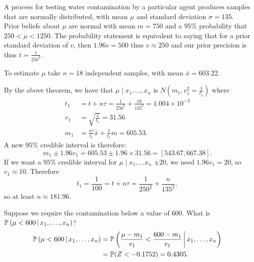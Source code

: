 \documentclass[10pt, a4paper]{article}
\begin{document}
\begin{example}
    A process for testing water contamination by a particular agent produces samples that are normally distributed,
    with mean $\mu$ and standard deviation $\sigma = 135$.
    Prior beliefs about $\mu$ are normal with mean $m = 750$ and a $95\%$ probability that $250 < \mu < 1250$.
    The probability statement is equivalent to saying that for a prior standard deviation of $v$,
    then $1.96v = 500$ thus $v \approx 250$ and our prior precision is thus $t = \frac{1}{250 ^ 2}$.

    To estimate $\mu$ take $n = 18$ independent samples,
    with mean $\bar{x} = 603.22$.

    By the above theorem,
    we have that $\mu\mid x_1, \dotsc, x_n$ is $N\left(m_1, v_1 ^ 2 = \frac{1}{t_1}\right)$ where
    \begin{align*}
        t_1 &= t + n\tau = \frac{1}{250 ^ 2} + \frac{18}{135 ^ 2} = 1.004 \times 10 ^ {-3} \\
        v_1 &= \sqrt{\frac{1}{t_1}} = 31.56 \\
        m_1 &= \frac{n\tau}{t_1}\bar{x} + \frac{t}{t_1}m = 605.53.
    \end{align*}
    A new $95\%$ credible interval is therefore:
    \[
    m_1 \pm 1.96v_1 = 605.53 \pm 1.96\times 31.56 = [543.67, 667.38].
    \]
    If we want a $95\%$ credible interval for $\mu\mid x_1, \dotsc x_n$ $\pm 20$,
    we need $1.96v_1 = 20$,
    so $v_1 \approx 10$.
    Therefore
    \[
    t_1 = \frac{1}{100} = t + n\tau = \frac{1}{250 ^ 2} + \frac{n}{135 ^ 2},
    \]
    so at least $n \approx 181.96$.

    Suppose we require the contamination below a value of $600$.
    What is $\mathbb{P}\left(\mu < 600 \,\middle|\, x_1, \dotsc, x_n\right)$?
    \begin{align*}
        \mathbb{P}\left(\mu < 600 \,\middle|\, x_1, \dotsc, x_n\right) &= \mathbb{P}\left(\frac{\mu - m_1}{v_1} < \frac{600 - m_1}{v_1} \,\middle|\, x_1, \dotsc, x_n\right) \\
        &= \mathbb{P}(Z < -0.1752) = 0.4305.
    \end{align*}
\end{example}
\end{document}
